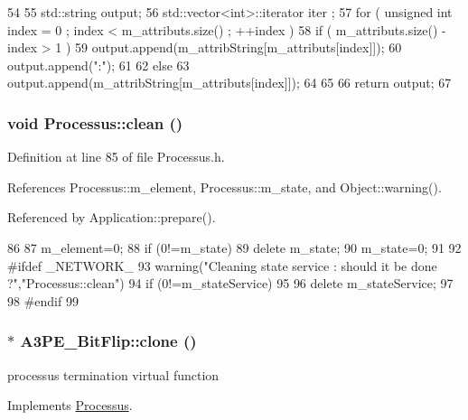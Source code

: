 \begin{DoxyCode}
54                             {
55   std::string output;
56   std::vector<int>::iterator iter ;
57   for ( unsigned int index = 0 ; index < m_attributs.size() ; ++index ) {
58     if ( m_attributs.size() - index > 1 ) {
59       output.append(m_attribString[m_attributs[index]]);
60       output.append(":");
61     }
62     else {
63       output.append(m_attribString[m_attributs[index]]);
64     }
65   }
66   return output;
67 }
\end{DoxyCode}
\hypertarget{classProcessus_aaeb17673b98d2b39f3aa780e335e0968}{
\subsubsection[{clean}]{\setlength{\rightskip}{0pt plus 5cm}void Processus::clean ()}}
\label{classProcessus_aaeb17673b98d2b39f3aa780e335e0968}


Definition at line 85 of file Processus.h.

References Processus::m\_\-element, Processus::m\_\-state, and Object::warning().

Referenced by Application::prepare().


\begin{DoxyCode}
86   {
87     m_element=0;
88     if (0!=m_state) {
89       delete m_state;
90       m_state=0;
91     }
92 #ifdef _NETWORK_
93     warning("Cleaning state service : should it be done ?","Processus::clean")
94       if (0!=m_stateService)
95       {
96         delete m_stateService;
97       }
98 #endif
99   }
\end{DoxyCode}
\hypertarget{classA3PE__BitFlip_a444f2b4fd5211e457105f13d19795211}{
\subsubsection[{clone}]{$\ast$ A3PE\_\-BitFlip::clone ()}}
\label{classA3PE__BitFlip_a444f2b4fd5211e457105f13d19795211}
processus termination virtual function 

Implements \hyperlink{classProcessus_aca8856f6d6d7b7e1fe941f298dcbb502}{Processus}.

